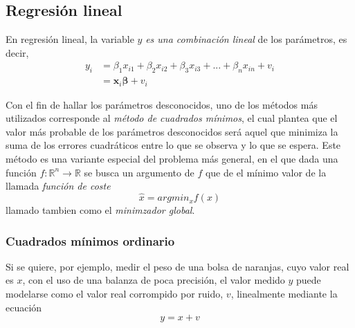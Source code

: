 

\subsection{Regresión lineal}
En regresión lineal, la variable $y$ \textit{es una combinación lineal} de los parámetros, es decir,
\begin{align}
    y_i &= \beta_1 x_{i1} + \beta_2 x_{i2} + \beta_3 x_{i3} + ... + \beta_n x_{in} + v_i \\
      &= \bm{x}_i \bm{\beta} + v_i
\end{align}

Con el fin de hallar los parámetros desconocidos, uno de los métodos más utilizados corresponde al \textit{método de cuadrados mínimos}, el cual plantea que el valor más probable de los parámetros desconocidos será aquel que minimiza la suma de los errores cuadráticos entre lo que se observa y lo que se espera. Este método es una variante especial del problema más general, en el que dada una función $f:\mathbb{R}^n\rightarrow\mathbb{R}$ se busca un argumento de $f$ que de el mínimo valor de la llamada \textit{función de coste}
\begin{equation}
    \hat{x} = argmin_x f(x)
    \label{eq:globalminimizer}
\end{equation}
llamado tambien como el \textit{minimzador global}.

\subsubsection{Cuadrados mínimos ordinario}
Si se quiere, por ejemplo, medir el peso de una bolsa de naranjas, cuyo valor real es $x$, con el uso de una balanza de poca precisión, el valor medido $y$ puede modelarse como el valor real corrompido por ruido, $v$, linealmente mediante la ecuación
\begin{equation}
    y = x + v
    \label{eq:linearmeasmodel}
\end{equation}

